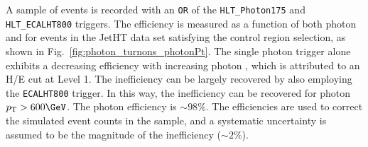 A sample of \gj events is recorded with an \verb!OR! of the
\verb!HLT_Photon175! and \verb!HLT_ECALHT800! triggers. The efficiency
is measured as a function of both photon \Pt and \HTmiss for events in
the JetHT data set satisfying the \gj control region selection, as
shown in Fig.~\ref{fig:photon_turnons_photonPt}. The single photon
trigger alone exhibits a decreasing efficiency with increasing photon
\Pt, which is attributed to an H/E cut at Level 1. The inefficiency
can be largely recovered by also employing the \verb!ECALHT800!
trigger. In this way, the inefficiency can be recovered for photon
$\Pt > 600\GeV$. The photon efficiency is $\sim 98\%$. The
efficiencies are used to correct the simulated event counts in the \gj
sample, and a systematic uncertainty is assumed to be the magnitude of
the inefficiency ($\sim 2\%$).


